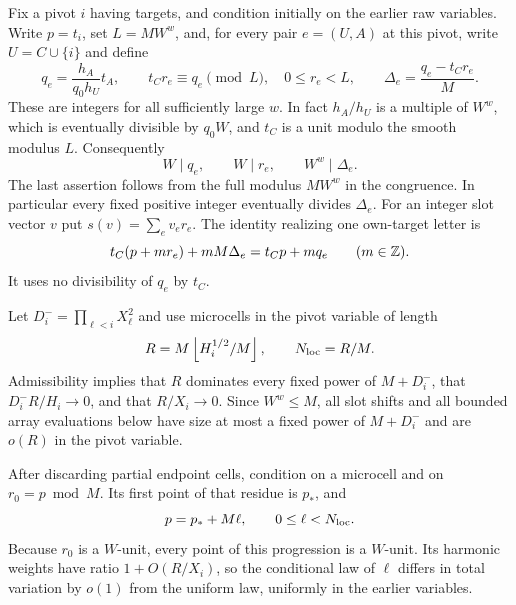 Fix a pivot $i$ having targets, and condition initially on the earlier
raw variables.  Write $p=t_i$, set $L=MW^w$, and, for every pair
$e=(U,A)$ at this pivot, write $U=C\cup\{i\}$ and define
\begin{equation}\label{eq:alignment-residue-data}
 q_e=\frac{h_A}{q_0h_U}t_A,\qquad
 t_Cr_e\equiv q_e\pmod L,\quad 0\le r_e<L,
 \qquad \Delta_e=\frac{q_e-t_Cr_e}{M}.
\end{equation}
These are integers for all sufficiently large $w$.  In fact
$h_A/h_U$ is a multiple of $W^w$, which is eventually divisible by
$q_0W$, and $t_C$ is a unit modulo the smooth modulus $L$.
Consequently
\begin{equation}\label{eq:alignment-residue-divisibility}
 W\mid q_e,\qquad W\mid r_e,\qquad W^w\mid\Delta_e.
\end{equation}
The last assertion follows from the full modulus $MW^w$ in the
congruence.  In particular every fixed positive integer eventually
divides $\Delta_e$.
For an integer slot vector $v$ put $s(v)=\sum_e v_er_e$.
The identity realizing one own-target letter is
\begin{equation}\label{eq:alignment-integer-identity}
 t_C(p+m r_e)+mM\Delta_e=t_Cp+m q_e\qquad(m\in\mathbb Z).
\end{equation}
It uses no divisibility of $q_e$ by $t_C$.

Let $D_i^-=\prod_{\ell<i}X_\ell^2$ and use microcells in the pivot
variable of length
\begin{equation}\label{eq:alignment-microcell}
 R=M\left\lfloor H_i^{1/2}/M\right\rfloor,
 \qquad N_{\rm loc}=R/M.
\end{equation}
Admissibility implies that $R$ dominates every fixed power of
$M+D_i^-$, that $D_i^-R/H_i\to0$, and that $R/X_i\to0$.
Since $W^w\le M$, all slot shifts and all bounded array evaluations
below have size at most a fixed power of $M+D_i^-$ and are $o(R)$
in the pivot variable.

After discarding partial endpoint cells, condition on a microcell and
on $r_0=p\bmod M$.  Its first point of that residue is $p_*$, and
\[
 p=p_*+M\ell,\qquad 0\le\ell<N_{\rm loc}.
\]
Because $r_0$ is a $W$-unit, every point of this progression is a
$W$-unit.  Its harmonic weights have ratio $1+O(R/X_i)$, so the
conditional law of $\ell$ differs in total variation by $o(1)$ from
the uniform law, uniformly in the earlier variables.

